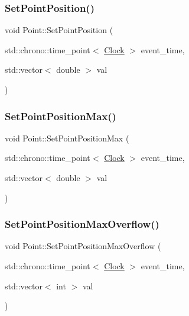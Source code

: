 \mbox{\label{classPoint_a9191f97ece64b8385140d5f800a3a4ca}} 
\subsubsection{\texorpdfstring{Set\+Point\+Position()}{SetPointPosition()}}
{\footnotesize\ttfamily void Point\+::\+Set\+Point\+Position (\begin{DoxyParamCaption}\item[{std\+::chrono\+::time\+\_\+point$<$ \mbox{\hyperlink{universe_8h_a0ef8d951d1ca5ab3cfaf7ab4c7a6fd80}{Clock}} $>$}]{event\+\_\+time,  }\item[{std\+::vector$<$ double $>$}]{val }\end{DoxyParamCaption})\hspace{0.3cm}{\ttfamily [inline]}}

\mbox{\label{classPoint_adb2897b1a7bde15e81b72cb59342f186}} 
\subsubsection{\texorpdfstring{Set\+Point\+Position\+Max()}{SetPointPositionMax()}}
{\footnotesize\ttfamily void Point\+::\+Set\+Point\+Position\+Max (\begin{DoxyParamCaption}\item[{std\+::chrono\+::time\+\_\+point$<$ \mbox{\hyperlink{universe_8h_a0ef8d951d1ca5ab3cfaf7ab4c7a6fd80}{Clock}} $>$}]{event\+\_\+time,  }\item[{std\+::vector$<$ double $>$}]{val }\end{DoxyParamCaption})\hspace{0.3cm}{\ttfamily [inline]}}

\mbox{\label{classPoint_a29aca71cae82195775f3822740df80ec}} 
\subsubsection{\texorpdfstring{Set\+Point\+Position\+Max\+Overflow()}{SetPointPositionMaxOverflow()}}
{\footnotesize\ttfamily void Point\+::\+Set\+Point\+Position\+Max\+Overflow (\begin{DoxyParamCaption}\item[{std\+::chrono\+::time\+\_\+point$<$ \mbox{\hyperlink{universe_8h_a0ef8d951d1ca5ab3cfaf7ab4c7a6fd80}{Clock}} $>$}]{event\+\_\+time,  }\item[{std\+::vector$<$ int $>$}]{val }\end{DoxyParamCaption})\hspace{0.3cm}{\ttfamily [inline]}}

